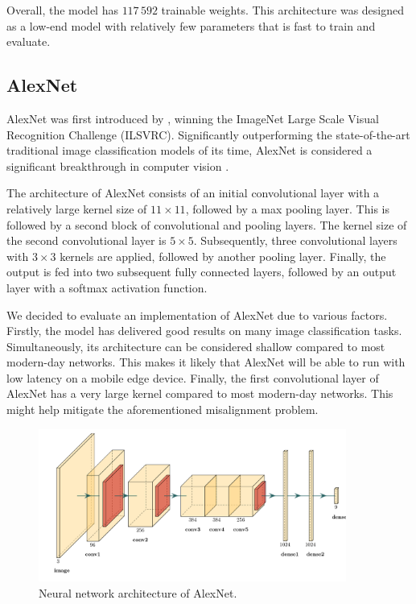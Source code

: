 \documentclass{l4proj}
\begin{document}
Overall, the model has $117\,592$ trainable weights. This architecture was designed as a low-end model with relatively few parameters that is fast to train and evaluate.

\subsection{AlexNet}

AlexNet was first introduced by \citet{krizhevsky_imagenet_2012}, winning the ImageNet Large Scale Visual Recognition Challenge (ILSVRC). Significantly outperforming the state-of-the-art traditional image classification models of its time, AlexNet is considered a significant breakthrough in computer vision \citep{alom_history_2018}.

The architecture of AlexNet consists of an initial convolutional layer with a relatively large kernel size of $11 \times 11$, followed by a max pooling layer. This is followed by a second block of convolutional and pooling layers. The kernel size of the second convolutional layer is $5 \times 5$. Subsequently, three convolutional layers with $3 \times 3$ kernels are applied, followed by another pooling layer. Finally, the output is fed into two subsequent fully connected layers, followed by an output layer with a softmax activation function.

We decided to evaluate an implementation of AlexNet due to various factors. Firstly, the model has delivered good results on many image classification tasks. Simultaneously, its architecture can be considered shallow compared to most modern-day networks. This makes it likely that AlexNet will be able to run with low latency on a mobile edge device. Finally, the first convolutional layer of AlexNet has a very large kernel compared to most modern-day networks. This might help mitigate the aforementioned misalignment problem.

\begin{figure}[ht]
  \centering
  \includegraphics[width=0.9\textwidth]{images/models/alexnet}
  \caption{Neural network architecture of AlexNet.}
  \label{fig:alexnet}
\end{figure}
\end{document}
